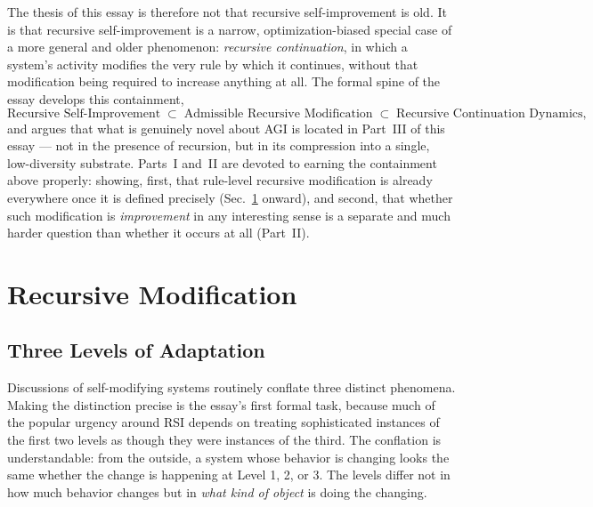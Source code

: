 \documentclass[11pt,a4paper]{article}
\theoremstyle{plain}
\theoremstyle{definition}
\theoremstyle{remark}
\begin{document}
The thesis of this essay is therefore not that recursive self-improvement is old. It is that recursive self-improvement is a narrow, optimization-biased special case of a more general and older phenomenon: \emph{recursive continuation}, in which a system's activity modifies the very rule by which it continues, without that modification being required to increase anything at all. The formal spine of the essay develops this containment,
\[
\text{Recursive Self-Improvement} \;\subset\; \text{Admissible Recursive Modification} \;\subset\; \text{Recursive Continuation Dynamics},
\]
and argues that what is genuinely novel about AGI is located in Part~III of this essay — not in the presence of recursion, but in its compression into a single, low-diversity substrate. Parts~I and~II are devoted to earning the containment above properly: showing, first, that rule-level recursive modification is already everywhere once it is defined precisely (Sec.~\ref{sec:recursive-modification} onward), and second, that whether such modification is \emph{improvement} in any interesting sense is a separate and much harder question than whether it occurs at all (Part~II).

\section{Recursive Modification}
\label{sec:recursive-modification}

\subsection{Three Levels of Adaptation}
\label{subsec:three-levels}

Discussions of self-modifying systems routinely conflate three distinct phenomena. Making the distinction precise is the essay's first formal task, because much of the popular urgency around RSI depends on treating sophisticated instances of the first two levels as though they were instances of the third. The conflation is understandable: from the outside, a system whose behavior is changing looks the same whether the change is happening at Level 1, 2, or 3. The levels differ not in how much behavior changes but in \emph{what kind of object} is doing the changing.
\end{document}
